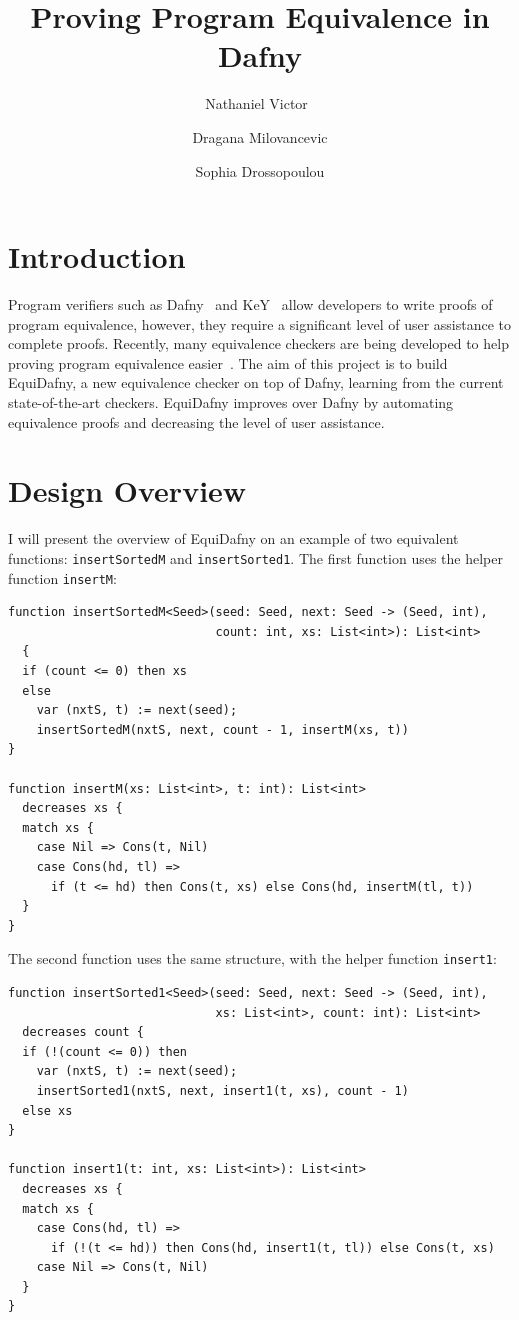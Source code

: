 \documentclass[runningheads]{llncs}
\begin{document}
%
\title{Proving Program Equivalence in Dafny}

\author{Nathaniel Victor~\and Dragana Milovancevic \and Sophia Drossopoulou}

%
\maketitle
%
\section{Introduction}

Program verifiers such as Dafny~\cite{leinoDafnyAutomaticProgram2010} and KeY~\cite{KeYBook2016} allow developers to write proofs of program equivalence, however, they require a significant level of user assistance to complete proofs.
Recently, many equivalence checkers are being developed to help proving program equivalence easier~\cite{lahiriSYMDIFFLanguageAgnosticSemantic2012,milovancevicProvingDisprovingEquivalence2023,FelsingEtAl,GodlinEtAl}. The aim of this project is to build EquiDafny, a new equivalence checker on top of Dafny, learning from the current state-of-the-art checkers. 
EquiDafny improves over Dafny by automating equivalence proofs and decreasing the level of user assistance.

\section{Design Overview} 

I will present the overview of EquiDafny on an example of two equivalent functions: \lstinline|insertSortedM| and \lstinline|insertSorted1|. 
The first function uses the helper function \lstinline|insertM|:
\begin{lstlisting}
function insertSortedM<Seed>(seed: Seed, next: Seed -> (Seed, int), 
                             count: int, xs: List<int>): List<int>
  {
  if (count <= 0) then xs
  else
    var (nxtS, t) := next(seed);
    insertSortedM(nxtS, next, count - 1, insertM(xs, t))
}

function insertM(xs: List<int>, t: int): List<int>
  decreases xs {
  match xs {
    case Nil => Cons(t, Nil)
    case Cons(hd, tl) =>
      if (t <= hd) then Cons(t, xs) else Cons(hd, insertM(tl, t))
  }
}
\end{lstlisting}
%
The second function uses the same structure, with the helper function \lstinline|insert1|:
\begin{lstlisting}
function insertSorted1<Seed>(seed: Seed, next: Seed -> (Seed, int),
                             xs: List<int>, count: int): List<int>
  decreases count {
  if (!(count <= 0)) then 
    var (nxtS, t) := next(seed);
    insertSorted1(nxtS, next, insert1(t, xs), count - 1)
  else xs
}

function insert1(t: int, xs: List<int>): List<int>
  decreases xs {
  match xs {
    case Cons(hd, tl) =>
      if (!(t <= hd)) then Cons(hd, insert1(t, tl)) else Cons(t, xs)
    case Nil => Cons(t, Nil)
  }
}
\end{lstlisting}
%
\end{document}
